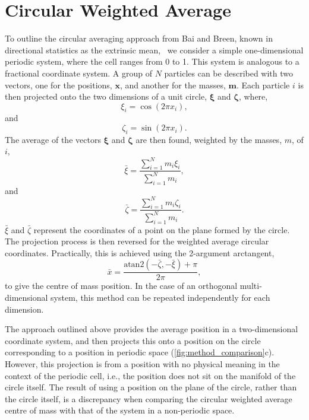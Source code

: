 \documentclass[reprint,superscriptaddress,nobibnotes,amsmath,amssymb,aip]{revtex4-2}
\begin{document}
\section{Circular Weighted Average}

To outline the circular averaging approach from Bai and Breen, known in directional statistics as the extrinsic mean,~\cite{hotz_intrinsic_2011} we consider a simple one-dimensional periodic system, where the cell ranges from \num{0} to \num{1}. 
This system is analogous to a fractional coordinate system. 
A group of $N$ particles can be described with two vectors, one for the positions, $\bm{x}$, and another for the masses, $\bm{m}$. 
Each particle $i$ is then projected onto the two dimensions of a unit circle, $\bm{\xi}$ and $\bm{\zeta}$, where, 
%
\begin{equation}
    \xi_i = \cos(2\pi x_i),
\end{equation}
%
and 
%
\begin{equation}
    \zeta_i = \sin(2\pi x_i).
\end{equation}
The average of the vectors $\bm{\xi}$ and $\bm{\zeta}$ are then found, weighted by the masses, $m$, of $i$,
%
\begin{equation}
    \bar{\xi} = \frac{\sum_{i=1}^{N}m_i\xi_i}{\sum_{i=1}^{N}m_i},
\end{equation}
% 
and
%
\begin{equation}
    \bar{\zeta} = \frac{\sum_{i=1}^{N}m_i\zeta_i}{\sum_{i=1}^{N}m_i}.
\end{equation}
% 
$\bar{\xi}$ and $\bar{\zeta}$ represent the coordinates of a point on the plane formed by the circle. 
The projection process is then reversed for the weighted average circular coordinates.
Practically, this is achieved using the 2-argument arctangent, 
%
\begin{equation}
    \bar{x} = \frac{\text{atan}2(-\bar{\zeta}, -\bar{\xi}) + \pi}{2\pi},
\end{equation}
%
to give the centre of mass position.
In the case of an orthogonal multi-dimensional system, this method can be repeated independently for each dimension. 

The approach outlined above provides the average position in a two-dimensional coordinate system, and then projects this onto a position on the circle corresponding to a position in periodic space (\cref{fig:method_comparison}c). 
However, this projection is from a position with no physical meaning in the context of the periodic cell, i.e., the position does not sit on the manifold of the circle itself.
The result of using a position on the plane of the circle, rather than the circle itself, is a discrepancy when comparing the circular weighted average centre of mass with that of the system in a non-periodic space. 
\end{document}

